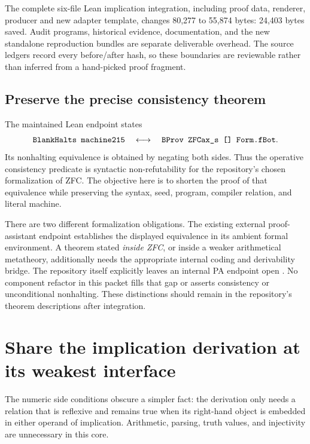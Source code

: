 \documentclass[11pt]{article}
\newcommand{\code}[1]{\texttt{\detokenize{#1}}}
\begin{document}
The complete six-file Lean implication integration, including proof data,
renderer, producer and new adapter template, changes 80,277 to 55,874 bytes:
24,403 bytes saved. Audit programs, historical evidence, documentation, and the
new standalone reproduction bundles are separate deliverable overhead. The
source ledgers record every before/after hash, so these boundaries are
reviewable rather than inferred from a hand-picked proof fragment.

\subsection{Preserve the precise consistency theorem}

The maintained Lean endpoint states \cite{endpoint}
\[
 \code{BlankHalts machine215}
 \quad\longleftrightarrow\quad
 \code{BProv ZFCax_s [] Form.fBot}.
\]
Its nonhalting equivalence is obtained by negating both sides. Thus the operative
consistency predicate is syntactic non-refutability for the repository's chosen
formalization of ZFC. The objective here is to shorten the proof of that
equivalence while preserving the syntax, seed, program, compiler relation, and
literal machine.

There are two different formalization obligations. The existing external
proof-assistant endpoint establishes the displayed equivalence in its ambient
formal environment. A theorem stated \emph{inside ZFC}, or inside a weaker
arithmetical metatheory, additionally needs the appropriate internal coding and
derivability bridge. The repository itself explicitly leaves an internal PA
endpoint open \cite{overview}. No component refactor in this packet fills that
gap or asserts consistency or unconditional nonhalting. These distinctions
should remain in the repository's theorem descriptions after integration.

\section{Share the implication derivation at its weakest interface}
\label{sec:implication}

The numeric side conditions obscure a simpler fact: the derivation only needs
a relation that is reflexive and remains true when its right-hand object is
embedded in either operand of implication. Arithmetic, parsing, truth values,
and injectivity are unnecessary in this core.
\end{document}
